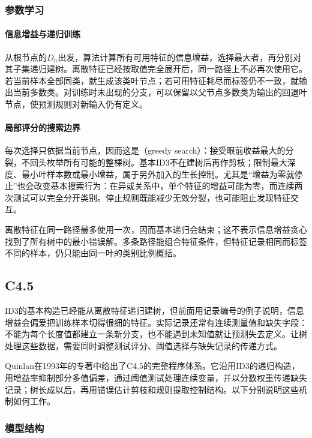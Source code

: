 \subsubsection{参数学习}
\label{sec:classification-id3-learning}

\paragraph{信息增益与递归训练}
从根节点的$D_n$出发，算法计算所有可用特征的信息增益，选择最大者，再分别对其子集递归建树。离散特征已经按取值完全展开后，同一路径上不必再次使用它。若当前样本全部同类，就生成该类叶节点；若可用特征耗尽而标签仍不一致，就输出当前多数类。对训练时未出现的分支，可以保留以父节点多数类为输出的回退叶节点，使预测规则对新输入仍有定义。

\paragraph{局部评分的搜索边界}
每次选择只依据当前节点，因而这是（greedy search）：接受眼前收益最大的分裂，不回头枚举所有可能的整棵树。基本ID3不在建树后再作剪枝；限制最大深度、最小叶样本数或最小增益，属于另外加入的生长控制。尤其是“增益为零就停止”也会改变基本搜索行为：在异或关系中，单个特征的增益可能为零，而连续两次测试可以完全分开类别。停止规则既能减少无效分裂，也可能阻止发现特征交互。

离散特征在同一路径最多使用一次，因而基本递归会结束；这不表示信息增益贪心找到了所有树中的最小错误解。多条路径能组合特征条件，但特征记录相同而标签不同的样本，仍只能由同一叶的类别比例概括。

\subsection{C4.5}
\label{sec:classification-c45}

ID3的基本构造已经能从离散特征递归建树，但前面用记录编号的例子说明，信息增益会偏爱把训练样本切得很细的特征。实际记录还常有连续测量值和缺失字段：不能为每个长度值都建立一条新分支，也不能遇到未知值就让预测失去定义。让树处理这些数据，需要同时调整测试评分、阈值选择与缺失记录的传递方式。

Quinlan在1993年的专著中给出了C4.5的完整程序体系。它沿用ID3的递归构造，用增益率抑制部分多值偏差，通过阈值测试处理连续变量，并以分数权重传递缺失记录；树长成以后，再用错误估计剪枝和规则提取控制结构。以下分别说明这些机制如何工作。

\subsubsection{模型结构}
\label{sec:classification-c45-structure}


